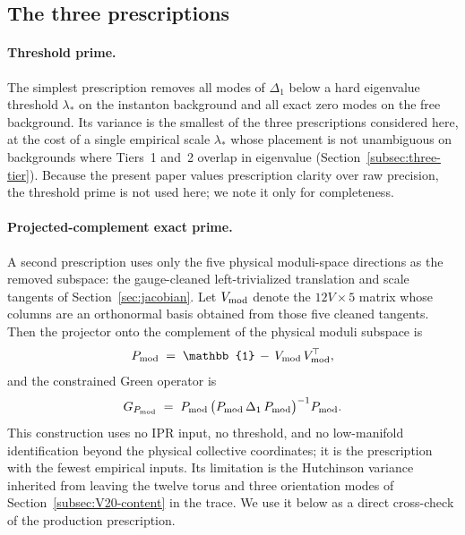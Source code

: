 \documentclass[a4paper,11pt]{article}
\theoremstyle{definition}
\begin{document}
\subsection{The three prescriptions}
\label{subsec:three-prescriptions}

\paragraph{Threshold prime.}
The simplest prescription removes all modes of $\Delta_1$ below a
hard eigenvalue threshold $\lambda_*$ on the instanton background
and all exact zero modes on the free background. Its variance is
the smallest of the three prescriptions considered here, at the
cost of a single empirical scale $\lambda_*$ whose placement is
not unambiguous on backgrounds where Tiers~1 and~2 overlap in
eigenvalue (Section~\ref{subsec:three-tier}). Because the present paper
values prescription clarity over raw precision, the threshold
prime is not used here; we note it only for completeness.

\paragraph{Projected-complement exact prime.}
A second prescription uses only the five physical moduli-space
directions as the removed subspace: the gauge-cleaned
left-trivialized translation and scale tangents of
Section~\ref{sec:jacobian}. Let $V_{\rm mod}$ denote the
$12V \times 5$ matrix whose columns are an orthonormal basis
obtained from those five cleaned tangents. Then the projector onto
the complement of the physical moduli subspace is
\begin{equation}
P_{\rm mod} \;=\; \mathbb{1} \,-\, V_{\rm mod}\,V_{\rm mod}^{\!\top},
\label{eq:Pmod}
\end{equation}
and the constrained Green operator is
\begin{equation}
G_{P_{\rm mod}}
\;=\;
P_{\rm mod}\,\bigl(P_{\rm mod}\,\Delta_1\,P_{\rm mod}\bigr)^{-1}
P_{\rm mod}.
\label{eq:exact-prime-Green}
\end{equation}
This construction uses no IPR input, no threshold, and no
low-manifold identification beyond the physical collective
coordinates; it is the prescription with the fewest empirical
inputs. Its limitation is the Hutchinson variance inherited from
leaving the twelve torus and three orientation modes of
Section~\ref{subsec:V20-content} in the trace. We use it below as a direct
cross-check of the production prescription.
\end{document}
